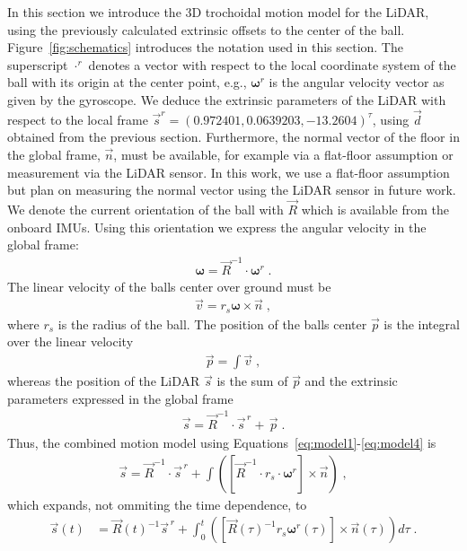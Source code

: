 In this section we introduce the 3D trochoidal motion model for the LiDAR, using the previously calculated extrinsic offsets to the center of the ball.
Figure~\ref{fig:schematics} introduces the notation used in this section.
The superscript $\cdot^r$ denotes a vector with respect to the local coordinate system of the ball with its origin at the center point, e.g., $\boldsymbol{\omega}^r$ is the angular velocity vector as given by the gyroscope. 
We deduce the extrinsic parameters of the LiDAR with respect to the local frame $\vec{s}^r = (0.972401, 0.0639203, -13.2604)^{\tau}$, using $\vec{d}$ obtained from the previous section.
Furthermore, the normal vector of the floor in the global frame, $\vec{n}$, must be available, for example via a flat-floor assumption or measurement via the LiDAR sensor.
In this work, we use a flat-floor assumption but plan on measuring the normal vector using the LiDAR sensor in future work. 
We denote the current orientation of the ball with $\vec{R}$ which is available from the onboard IMUs.
Using this orientation we express the angular velocity in the global frame:
\begin{align}
\boldsymbol{\omega} = \vec{R}^{-1} \cdot \boldsymbol{\omega}^r\;.
\label{eq:model1}
\end{align}
The linear velocity of the balls center over ground must be 
\begin{align}
\vec{v} = r_s \boldsymbol{\omega} \times \vec{n}\;,
\label{eq:model2}
\end{align}
where $r_s$ is the radius of the ball.
The position of the balls center $\vec{p}$ is the integral over the linear velocity 
\begin{align}
\vec{p} = \int \vec{v} \;,
\label{eq:model3}
\end{align}
whereas the position of the LiDAR $\vec{s}$ is the sum of $\vec{p}$ and the extrinsic parameters expressed in the global frame
\begin{align}
\vec{s} = \vec{R}^{-1} \cdot \vec{s}^{\,r} + \,\vec{p}\;.
\label{eq:model4}
\end{align}
Thus, the combined motion model using Equations~\eqref{eq:model1}-\eqref{eq:model4} is 
\begin{align}
\vec{s} = \vec{R}^{-1} \cdot \vec{s}^{\,r} + \int \left( \left[ \vec{R}^{-1} \cdot r_s \cdot \boldsymbol{\omega}^r \right] \times \vec{n}\right)\;,
\end{align}
which expands, not ommiting the time dependence, to
\begin{align}
  \vec{s}(t) &= \vec{R}(t)^{-1} \vec{s}^{\,r} + \int_0^t\left( \left[ \vec{R}(\tau)^{-1} r_s \boldsymbol{\omega}^r(\tau) \right]\times \vec{n}(\tau) \right) d\tau\;.
  \label{eq:motionmodel}
\end{align}
